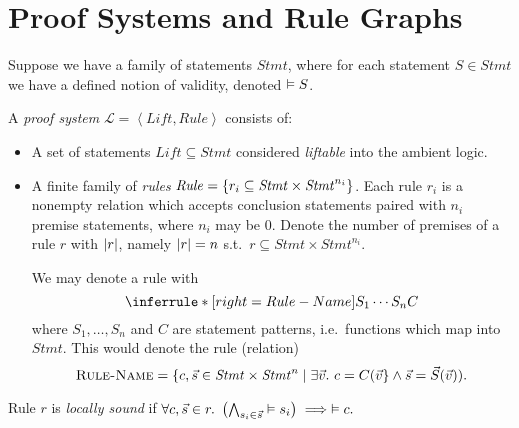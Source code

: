 
\section{Proof Systems and Rule Graphs}

\newcommand*{\DomLiftable}{\mathit{Lift}}
\newcommand*{\DomStmt}{\mathit{Stmt}}
\newcommand*{\DomRule}{\mathit{Rule}}
\newcommand*{\LIFT}{\textsc{Lift}}

Suppose we have a family of statements $\DomStmt$,
where for each statement $S \in \DomStmt$
we have a defined notion of validity,
denoted $\vDash S$.

\newcommand*{\proofsysname}{\mathcal{L}}
\newcommand*{\proofsys}[2]{\left\langle #1, #2\right\rangle}

\newcommand*{\numprems}[1]{
    \abs{#1}
}

\begin{definition}
    A \emph{proof system} 
    $\proofsysname = \proofsys\DomLiftable\DomRule$
    consists of:
    \begin{itemize}
    \item A set of statements $\DomLiftable \subseteq \DomStmt$ considered \emph{liftable} into the ambient logic.
    \item A finite family of \emph{rules}
    $\DomRule = \set{r_i \subseteq \DomStmt \times \DomStmt^{n_i}}$.
    Each rule $r_i$ is a nonempty relation which accepts
    conclusion statements paired with
    $n_i$ premise statements, where $n_i$ may be 0.
    Denote the number of premises of a rule $r$
    with $\numprems r$,
    namely $\numprems r = n$ s.t.\
    $r \subseteq \DomStmt \times \DomStmt^{n_i}$.

    We may denote a rule with
    \[
        \inferrule*[right=Rule-Name]{
            S_1 \\ \cdots \\ S_n
        }{
            C
        }
    \]
    where $S_1,\dots,S_n$ and $C$ are statement patterns, i.e.\ functions which map into $\DomStmt$.
    This would denote the rule (relation)
    \[
        \textsc{Rule-Name} =
        \SetBuild(
            c, \vec s \in \DomStmt \times \DomStmt^n
        |
            \exists \vec v.\
            c = C(\vec v) \wedge
            \vec s = \vec S(\vec v)
        ).
    \]
    \end{itemize} 
\end{definition}
%
\begin{definition}
    \label{def:locally-sound-rule}
    Rule $r$ is \emph{locally sound} if
    \(
        \forall c, \vec s \in r.\
        \left(
            \bigwedge_{s_i \in \vec s}
            \vDash s_i
        \right)
        \implies \vDash c.
    \)
\end{definition}
%


